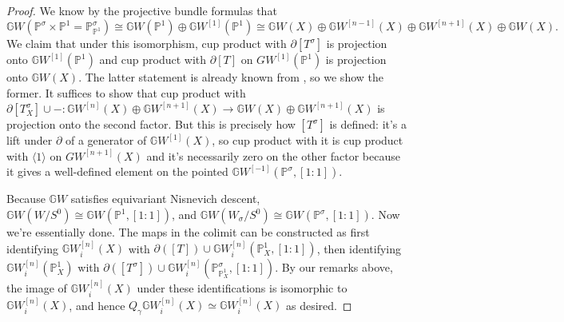 \documentclass[edeposit,fullpage]{uiucthesis2009}
\newcommand{\mbb}{\mathbb}
\theoremstyle{plain}
\numberwithin{lemma}{section}
\theoremstyle{definition}
\begin{document}
\begin{proof}
We know by the projective bundle formulas
that 
\[
\mbb GW(\mbb P^\sigma \times \mbb P^1 = \mbb
P^\sigma_{\mbb P^1}) \cong \mbb GW(\mbb P^1) \oplus \mbb GW^{[1]}(\mbb
P^1) \cong \mbb GW(X) \oplus \mbb GW^{[n-1]}(X) \oplus \mbb
GW^{[n+1]}(X) \oplus \mbb GW(X).
\]
We claim that under this isomorphism, cup product with
$\partial [T^\sigma]$ is projection onto $\mbb
GW^{[1]}(\mbb P^1)$ and cup product with $\partial [T]$ on
$GW^{[1]}(\mbb P^1)$ is projection
onto $\mbb GW(X)$. The latter statement is already known from
\cite{Schder}, so we show the former. It suffices to show that cup
product with $\partial [T^\sigma_{X}] \cup - : \mbb GW^{[n]}(X) \oplus
\mbb GW^{[n+1]}(X) \rightarrow \mbb GW(X) \oplus \mbb GW^{[n+1]}(X)$ is projection
onto the second factor. But this is precisely how $[T^\sigma]$ is
defined: it's a lift under $\partial$ of a generator of $\mbb
GW^{[1]}(X)$, so cup product with it is cup product with $\langle 1
\rangle$ on $GW^{[n+1]}(X)$
and it's necessarily zero on the other factor because it gives a
well-defined element on
the pointed $\mbb GW^{[-1]}(\mbb P^\sigma,[1:1])$. 

 
Because $\mbb GW$ satisfies equivariant Nisnevich descent, $\mbb
GW(W/S^0) \cong \mbb GW(\mbb P^1,[1:1])$, and $\mbb GW(W_\sigma/S^0)
\cong \mbb GW(\mbb P^\sigma,[1:1])$. Now we're essentially done. The
maps in the colimit can be constructed as first identifying $\mbb GW_i^{[n]}(X)$
with $\partial([T]) \cup \mbb GW_i^{[n]}(\mbb P^1_X,[1:1])$, then identifying
$\mbb GW_i^{[n]}(\mbb P^1_X)$ with  $\partial([T^\sigma]) \cup
\mbb GW_i^{[n]}(\mbb P^\sigma_{\mbb P^1_X},[1:1])$. By our remarks above,
the image of $\mbb GW_i^{[n]}(X)$ under these identifications is isomorphic
to $\mbb GW_i^{[n]}(X)$, and hence $Q_\gamma\mbb GW_i^{[n]}(X) \simeq \mbb
GW_i^{[n]}(X)$ as desired.



\end{proof}
\end{document}
